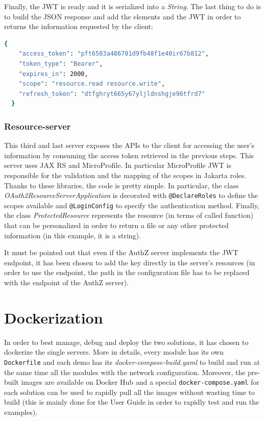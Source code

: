\noindent Finally, the JWT is ready and it is serialized into a \textit{String}. The last thing to do is to build the JSON response and add the elements and the JWT in order to returns the information requested by the client:


\begin{lstlisting}[language=bash, basicstyle=\fontsize{12}{14}\ttfamily]
  {
    "access_token": "pft6503a486701d9fb48f1e40ir67b812",
    "token_type": "Bearer",  
    "expires_in": 2000,
    "scope": "resource.read resource.write",
    "refresh_token": "dtfghryt665y67yljldnshgje96tfrd7"
  }
\end{lstlisting}

\subsubsection{Resource-server}
This third and last server exposes the APIs to the client for accessing the user's information by consuming the access token retrieved in the previous steps. This server uses JAX RS and MicroProfile. In particular MicroProfile JWT is responsible for the validation and the mapping of the scopes in Jakarta roles. Thanks to these libraries, the code is pretty simple. In particular, the class \textit{OAuth2ResourceServerApplication} is decorated with \texttt{@DeclareRoles} to define the scopes available and \texttt{@LoginConfig} to specify the authentication method. Finally, the class \textit{ProtectedResource} represents the resource (in terms of called function) that can be personalized in order to return a file or any other protected information (in this example, it is a string).

It must be pointed out that even if the AuthZ server implements the JWT endpoint, it has been chosen to add the key directly in the server's resources (in order to use the endpoint, the path in the configuration file has to be replaced with the endpoint of the AuthZ server).

\section{Dockerization}
In order to best manage, debug and deploy the two solutions, it has chosen to dockerize the single servers. More in details, every module has its own \texttt{Dockerfile} and each demo has its \textit{docker-compose-build.yaml} to build and run at the same time all the modules with the network configuration. Moreover, the pre-built images are available on Docker Hub and a special \texttt{docker-compose.yaml} for each solution can be used to rapidly pull all the images without wasting time to build (this is mainly done for the User Guide in order to rapidly test and run the examples).

